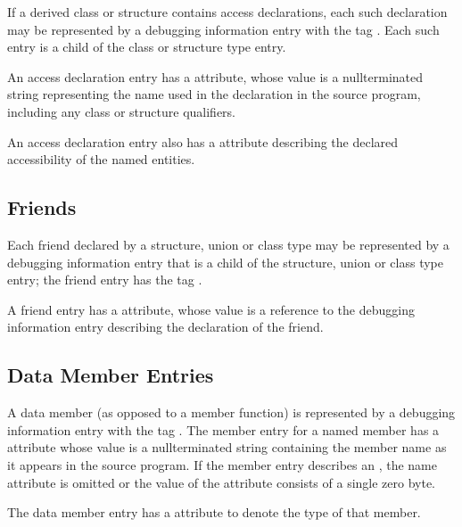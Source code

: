 If a derived class or structure contains access declarations,
each such declaration may be represented by a debugging
information entry with the tag 
\DWTAGaccessdeclarationTARG. 
Each
such entry is a child of the class or structure type entry.

An access declaration entry has 
a \DWATname{} attribute, 
whose
value is a null\dash terminated string representing the name used
in the declaration in the source program, including any class
or structure qualifiers.

An access declaration entry 
\hypertarget{chap:DWATaccessibilitycppbaseclasses}{}
also 
has a 
\DWATaccessibilityDEFN{}
attribute describing the declared accessibility of the named
entities.


\subsection{Friends}
\label{chap:friends}

Each friend
declared by a structure, union or class
\hypertarget{chap:DWATfriendfriendrelationship}{}
type may be represented by a debugging information entry
that is a child of the structure, union or class type entry;
the friend entry has the tag \DWTAGfriendTARG.

A friend entry has a \DWATfriendDEFN{} attribute,
 whose value is
a reference to the debugging information entry describing
the declaration of the friend.


\subsection{Data Member Entries}
\label{chap:datamemberentries}

A data member (as opposed to a member function) is
represented by a debugging information entry with the 
tag \DWTAGmemberTARG. 
The 
member entry for a named member has
a \DWATname{} attribute 
whose value is a null\dash terminated
string containing the member name as it appears in the source
program. If the member entry describes an 
,
the name attribute is omitted or the value of the attribute
consists of a single zero byte.

The data member entry has a 
\DWATtype{} attribute to denote
 the type of that member.

